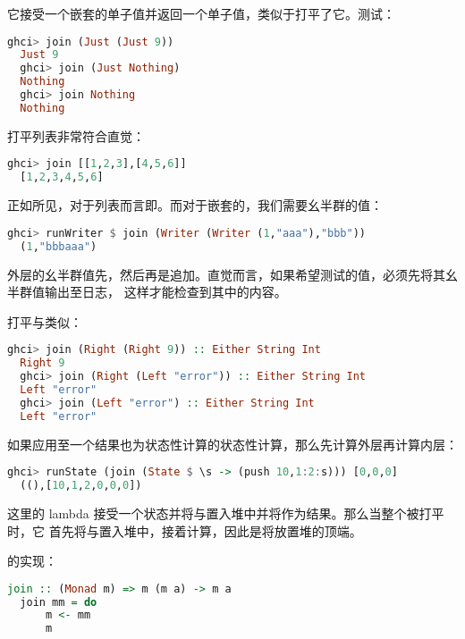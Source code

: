 \documentclass[./main.tex]{subfiles}
\begin{document}
它接受一个嵌套的单子值并返回一个单子值，类似于打平了它。测试：

\begin{lstlisting}[language=Haskell]
  ghci> join (Just (Just 9))
  Just 9
  ghci> join (Just Nothing)
  Nothing
  ghci> join Nothing
  Nothing
\end{lstlisting}

打平列表非常符合直觉：

\begin{lstlisting}[language=Haskell]
  ghci> join [[1,2,3],[4,5,6]]
  [1,2,3,4,5,6]
\end{lstlisting}

正如所见，对于列表而言即。而对于嵌套的，我们需要幺半群的值：

\begin{lstlisting}[language=Haskell]
  ghci> runWriter $ join (Writer (Writer (1,"aaa"),"bbb"))
  (1,"bbbaaa")
\end{lstlisting}

外层的幺半群值先，然后再是追加。直觉而言，如果希望测试的值，必须先将其幺半群值输出至日志，
这样才能检查到其中的内容。

打平与类似：

\begin{lstlisting}[language=Haskell]
  ghci> join (Right (Right 9)) :: Either String Int
  Right 9
  ghci> join (Right (Left "error")) :: Either String Int
  Left "error"
  ghci> join (Left "error") :: Either String Int
  Left "error"
\end{lstlisting}

如果应用至一个结果也为状态性计算的状态性计算，那么先计算外层再计算内层：

\begin{lstlisting}[language=Haskell]
  ghci> runState (join (State $ \s -> (push 10,1:2:s))) [0,0,0]
  ((),[10,1,2,0,0,0])
\end{lstlisting}

这里的 lambda 接受一个状态并将与置入堆中并将作为结果。那么当整个被打平时，它
首先将与置入堆中，接着计算，因此是将放置堆的顶端。

的实现：

\begin{lstlisting}[language=Haskell]
  join :: (Monad m) => m (m a) -> m a
  join mm = do
      m <- mm
      m
\end{lstlisting}
\end{document}
